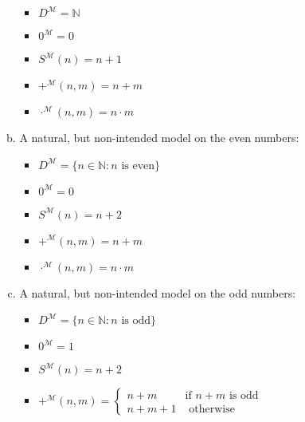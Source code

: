 \begin{enumerate}[\thesection.1]
\begin{enumerate}[(i)]
\begin{enumerate}[(a)]
						\begin{itemize}
					
							\item $D^\mathcal{M}=\mathbb{N}$
							
							\item $0^\mathcal{M}=0$
					
							\item $S^\mathcal{M}(n)=n+1$
							
							\item $+^\mathcal{M}(n,m)=n+m$
							
							\item $\cdot^\mathcal{M}(n,m)=n\cdot m$
					
						\end{itemize}
						
					\item A natural, but non-intended model on the even numbers:
					
						\begin{itemize}
					
							\item $D^\mathcal{M}=\{n\in\mathbb{N}:n\text{ is even}\}$
																					\item $0^\mathcal{M}=0$
					
							\item $S^\mathcal{M}(n)=n+2$
							
							\item $+^\mathcal{M}(n,m)=n+m$
							
							\item $\cdot^\mathcal{M}(n,m)=n\cdot m$
					
						\end{itemize}
						
					\item A natural, but non-intended model on the odd numbers:
					
						\begin{itemize}
					
							\item $D^\mathcal{M}=\{n\in\mathbb{N}:n\text{ is odd}\}$
																					\item $0^\mathcal{M}=1$
					
							\item $S^\mathcal{M}(n)=n+2$
							
							\item $+^\mathcal{M}(n,m)=\begin{cases}n+m&\text{if }n+m\text{ is odd}\\n+m+1&\text{ otherwise}\end{cases}$
							

\end{itemize}
\end{enumerate}
\end{enumerate}
\end{enumerate}
